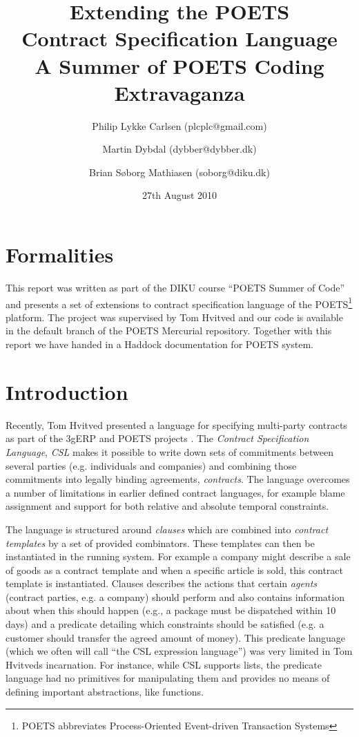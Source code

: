 \documentclass[10pt,a4paper,final,oneside,openany,article]{memoir}
\title{Extending the POETS \\ Contract Specification Language\\
       \vspace{0.1cm}
        \small{A Summer of POETS Coding Extravaganza}}
\author{Philip Lykke Carlsen (plcplc@gmail.com) \and
        Martin Dybdal (dybber@dybber.dk) \and
        Brian Søborg Mathiasen (soborg@diku.dk)}
\date{27th August 2010}
\begin{document}
\listoffixmes
{}

\newpage
\maketitle

\chapter{Formalities}
This report was written as part of the DIKU course ``POETS Summer of
Code'' and presents a set of extensions to contract specification
language of the POETS\footnote{POETS abbreviates Process-Oriented
  Event-driven Transaction Systems} platform. The project was
supervised by Tom Hvitved and our code is available in the default
branch of the POETS Mercurial repository. Together with this report we
have handed in a Haddock documentation for POETS system.

\chapter{Introduction}
Recently, Tom Hvitved presented a language for specifying multi-party
contracts \cite{hvitved10} as part of the 3gERP and POETS projects
\cite{3gerp}. The \textit{Contract Specification Language},
\textit{CSL} makes it possible to write down sets of commitments
between several parties (e.g. individuals and companies) and combining
those commitments into legally binding agreements,
\textit{contracts}. The language overcomes a number of limitations in
earlier defined contract languages, for example blame assignment and
support for both relative and absolute temporal constraints.

The language is structured around \textit{clauses} which are combined
into \textit{contract templates} by a set of provided
combinators. These templates can then be instantiated in the running
system. For example a company might describe a sale of goods as a
contract template and when a specific article is sold, this contract
template is instantiated. Clauses describes the actions that certain
\textit{agents} (contract parties, e.g. a company) should perform and
also contains information about when this should happen (e.g., a
package must be dispatched within 10 days) and a predicate detailing
which constraints should be satisfied (e.g. a customer should transfer
the agreed amount of money). This predicate language (which we often
will call ``the CSL expression language'') was very limited in Tom
Hvitveds incarnation. For instance, while CSL supports lists, the
predicate language had no primitives for manipulating them and
provides no means of defining important abstractions, like functions.
\end{document}
